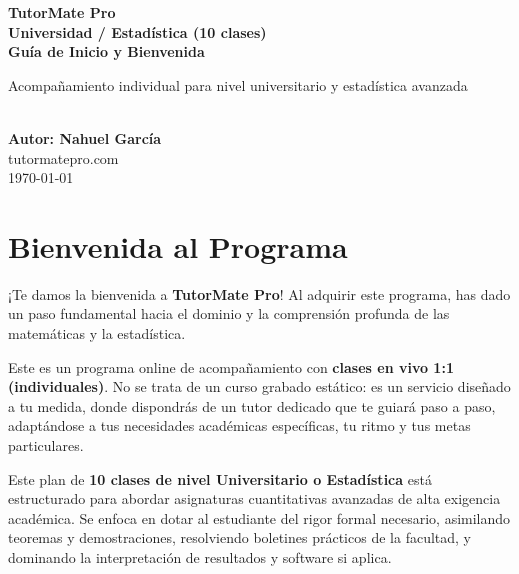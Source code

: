 \documentclass[11pt,a4paper]{article}
\begin{document}
\begin{titlepage}
    \centering
    \vspace*{2cm}
    {\Huge \color{primary} \textbf{TutorMate Pro}} \\[0.5cm]
    {\huge \color{accent} \textbf{Universidad / Estadística (10 clases)}} \\[0.8cm]
    {\Large \color{gold} \textbf{Guía de Inicio y Bienvenida}} \\[1.5cm]
    
    \begin{minipage}{0.8\textwidth}
        \centering
        \large \color{primary} Acompañamiento individual para nivel universitario y estadística avanzada
    \end{minipage} \\[2cm]
    
    \vspace*{\fill}
    {\large \color{primary} \textbf{Autor: Nahuel García}} \\
    {\large \color{primary} tutormatepro.com} \\
    {\small \color{accent} \today}
\end{titlepage}

\newpage
\tableofcontents
\newpage

\section{Bienvenida al Programa}
¡Te damos la bienvenida a \textbf{TutorMate Pro}! Al adquirir este programa, has dado un paso fundamental hacia el dominio y la comprensión profunda de las matemáticas y la estadística. 

Este es un programa online de acompañamiento con \textbf{clases en vivo 1:1 (individuales)}. No se trata de un curso grabado estático: es un servicio diseñado a tu medida, donde dispondrás de un tutor dedicado que te guiará paso a paso, adaptándose a tus necesidades académicas específicas, tu ritmo y tus metas particulares.

Este plan de \textbf{10 clases de nivel Universitario o Estadística} está estructurado para abordar asignaturas cuantitativas avanzadas de alta exigencia académica. Se enfoca en dotar al estudiante del rigor formal necesario, asimilando teoremas y demostraciones, resolviendo boletines prácticos de la facultad, y dominando la interpretación de resultados y software si aplica.
\end{document}
